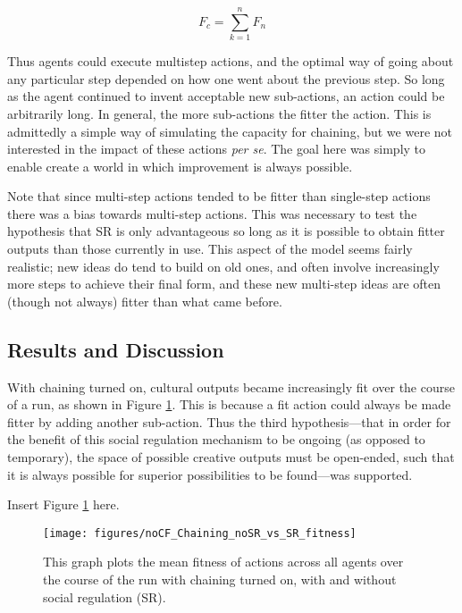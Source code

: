 \documentclass[a4paper,12pt,man,british]{apa6}
\begin{document}
\begin{equation}
F_c= \sum\limits_{k = 1}^n {F_n} 
\label{eq:fitnesschained}
\end{equation}

\bigskip \noindent Thus agents could execute multistep actions, and the optimal way of going about any particular step depended on how one went about the previous step. So long as the agent continued to invent acceptable new sub-actions, an action could be arbitrarily long. In general, the more sub-actions the fitter the action. This is admittedly a simple way of simulating the capacity for chaining, but we were not interested in the impact of these actions {\it per se}. The goal here was simply to enable create a world in which improvement is always possible. 

Note that since multi-step actions tended to be fitter than single-step actions there was a bias towards multi-step actions. This was necessary to test the hypothesis that SR is only advantageous so long as it is possible to obtain fitter outputs than those currently in use. This aspect of the model seems fairly realistic; new ideas do tend to build on old ones, and often involve increasingly more steps to achieve their final form, and these new multi-step ideas are often (though not always) fitter than what came before. 

\subsection{Results and Discussion}

With chaining turned on, cultural outputs became increasingly fit over the course of a run, as shown in Figure \ref{fig:F4-no-CF-yes-Chaining-fitness}. This is because a fit action could always be made fitter by adding another sub-action. 
Thus the third hypothesis---that in order for the benefit of this social regulation mechanism to be ongoing (as opposed to temporary), the space of possible creative outputs must be open-ended, such that it is always possible for superior possibilities to be found---was supported.

\begin{center} %
Insert Figure \ref{fig:F4-no-CF-yes-Chaining-fitness} here.
\end{center}

\begin{figure}
\centering
\texttt{[image: figures/noCF\_Chaining\_noSR\_vs\_SR\_fitness]}
\caption{This graph plots the mean fitness of actions across all agents over the course of the run with chaining turned on, with and without social regulation (SR).}
\label{fig:F4-no-CF-yes-Chaining-fitness}
\end{figure}
\end{document}
